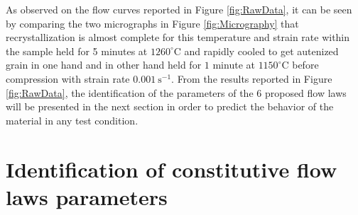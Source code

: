 \documentclass[twoside,english,1p,final,sort&compress]{elsarticle}
\theoremstyle{plain}
\begin{document}
As observed on the flow curves reported in Figure \ref{fig:RawData}, it can be seen by comparing the two micrographs in Figure \ref{fig:Micrography} that recrystallization is almost complete for this temperature and strain rate within the sample held for 5 minutes at $1260^\circ$C and rapidly cooled to get autenized grain in one hand and in other hand held for $1$ minute at $1150^\circ$C before compression with strain rate $0.001~\text{s}^{-1}$.
From the results reported in Figure \ref{fig:RawData}, the identification of the parameters of the 6 proposed flow laws will be presented in the next section in order to predict the behavior of the material in any test condition.

\section{Identification of constitutive flow laws parameters\label{sec:ConstLaws}}
\end{document}

